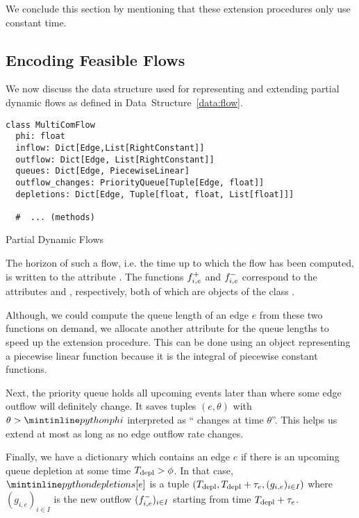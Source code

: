 We conclude this section by mentioning that these extension procedures only use constant time.

\subsection{Encoding Feasible Flows}

We now discuss the data structure used for representing and extending partial dynamic flows as defined in Data~Structure~\ref{data:flow}.

\begin{classdef}
    \begin{verbatim}
class MultiComFlow
  phi: float
  inflow: Dict[Edge,List[RightConstant]]
  outflow: Dict[Edge, List[RightConstant]]
  queues: Dict[Edge, PiecewiseLinear]
  outflow_changes: PriorityQueue[Tuple[Edge, float]]
  depletions: Dict[Edge, Tuple[float, float, List[float]]]

  #  ... (methods)
\end{verbatim}
    \caption{Partial Dynamic Flows}
    \label{data:flow}
\end{classdef}

The horizon of such a flow, i.e. the time up to which the flow has been computed, is written to the attribute .
The functions ${f}^+_{i,e}$ and ${f}^-_{i,e}$ correspond to the attributes  and , respectively, both of which are objects of the class .

Although, we could compute the queue length of an edge $e$ from these two functions on demand, we allocate 
another attribute  for the queue lengths to speed up the extension procedure.
This can be done using an object representing a piecewise linear function because it is the integral of piecewise constant functions.

Next, the priority queue  holds all upcoming events later than  where some edge outflow will definitely change.
It saves tuples $(e, \theta)$ with $\theta > \code{phi}$ interpreted as `` changes at time $\theta$''.
This helps us extend at most as long as no edge outflow rate changes.

Finally, we have a dictionary  which contains an edge $e$ if there is an upcoming queue depletion at some time $T_{\textnormal{depl}} > \phi$.
In that case, $\code{depletions[e]}$ is a tuple $(T_{\textnormal{depl}}, T_{\textnormal{depl}}+ \tau_e, (g_{i,e})_{i\in I})$ where $(g_{i,e})_{i\in I}$ is the new outflow $({f}^-_{i,e})_{i\in I}$ starting from time $T_{\textnormal{depl}} + \tau_e$.


